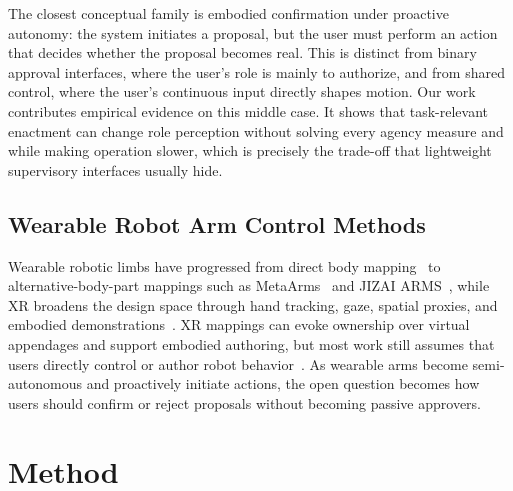 \documentclass[sigconf,review,anonymous]{acmart}
\begin{document}
The closest conceptual family is embodied confirmation under proactive autonomy: the system initiates a proposal, but the user must perform an action that decides whether the proposal becomes real. This is distinct from binary approval interfaces, where the user's role is mainly to authorize, and from shared control, where the user's continuous input directly shapes motion. Our work contributes empirical evidence on this middle case. It shows that task-relevant enactment can change role perception without solving every agency measure and while making operation slower, which is precisely the trade-off that lightweight supervisory interfaces usually hide.

\subsection{Wearable Robot Arm Control Methods}

Wearable robotic limbs have progressed from direct body mapping~\cite{10.1145/3544548.3581184} to alternative-body-part mappings such as MetaArms~\cite{10.1145/3242587.3242665} and JIZAI ARMS~\cite{10.1145/3544548.3581169}, while XR broadens the design space through hand tracking, gaze, spatial proxies, and embodied demonstrations~\cite{wang2403systematic, kim2025controllers, 10.5555/3378680.3378711, 10.1145/3706598.3713812, 10.1145/3332165.3347902, 10.1145/3746058.3758451, 10.1145/3586183.3606743}. XR mappings can evoke ownership over virtual appendages and support embodied authoring, but most work still assumes that users directly control or author robot behavior~\cite{10.1145/3613904.3642340, 10.1145/3139131.3139149}. As wearable arms become semi-autonomous and proactively initiate actions, the open question becomes how users should confirm or reject proposals without becoming passive approvers.


\section{Method}

\end{document}
